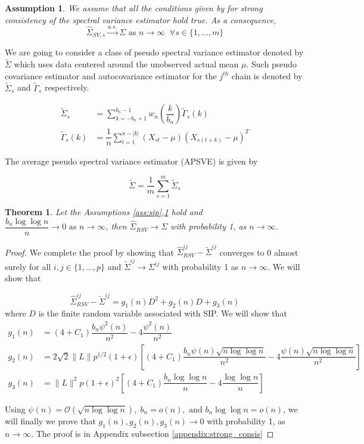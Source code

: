 \documentclass[12pt]{article}
\newtheorem{theorem}{Theorem}
\newtheorem{ass}{Assumption}
\begin{document}
\bigskip

\begin{ass} \label{ass:sve_consis} We assume that all the conditions given by \cite{vats:fleg:jon:2018} for strong consistency of the spectral variance estimator hold true. As a consequence, 
\[
\hat{\Sigma}_{SV,s} \xrightarrow{a.s.} \Sigma \textrm{ as } n \to \infty \;\; \forall s \in \{1,..., m\}
\]
\end{ass}

\bigskip

We are going to consider a class of pseudo spectral variance estimator denoted by $\tilde{\Sigma}$ which uses data centered around the unobserved actual mean $\mu$. Such pseudo covariance estimator and autocovariance estimator for the $j^{th}$ chain is denoted by $\tilde{\Sigma}_s$ and $\tilde{\Gamma}_s$ respectively.

\begin{align*}
    \tilde{\Sigma}_s &= \sum_{k=-b_n+1}^{b_n-1}w_n\left(\dfrac{k}{b_n}\right)\tilde{\Gamma}_s(k)\\
    \tilde{\Gamma}_s(k) &= \dfrac{1}{n}\sum_{t=1}^{n-|k|}(X_{st}-\mu)(X_{s(t+k)}-\mu)^T
\end{align*}

The average pseudo spectral variance estimator (APSVE) is given by

\[
\tilde{\Sigma} = \dfrac{1}{m}\sum\limits_{s=1}^{m}\tilde{\Sigma}_s
\]

\bigskip
\begin{theorem}
\label{th:consistency}
 Let the Assumptions \ref{ass:sip},\ref{ass:sve_consis} hold and $\dfrac{b_n \log \log n}{n} \to 0 \textrm{ as } n \to \infty$, then $\hat{\Sigma}_{RSV} \to \Sigma$ with probability 1, as $n \to \infty$.
\end{theorem} 

\begin{proof}
We complete the proof by showing that $\hat{\Sigma}_{RSV}^{ij} - \tilde{\Sigma}^{ij}$ converges to 0 almost surely for all $i,j \in \{1,...,p\}$ and $\tilde{\Sigma}^{ij} \to \Sigma^{ij}$ with probability 1 as $n \to \infty$. We will show that 

\[
\hat{\Sigma}_{RSV}^{ij} - \tilde{\Sigma}^{ij} = g_1(n)D^2 + g_2(n)D + g_3(n)
\]
where $D$ is the finite random variable associated with SIP. We will show that\\

\begin{align*}
    g_1(n) &= (4+C_1)\dfrac{b_n \psi^2(n)}{n^2} - 4\dfrac{\psi^2(n)}{n^2}\\
    g_2(n) &= 2\sqrt{2}\|L\|p^{1/2}(1+\epsilon)\left[(4+C_1)\dfrac{b_n\psi(n)\sqrt{n\log \log n}}{n^2} - 4\dfrac{\psi(n)\sqrt{n\log \log n}}{n^2}\right]\\
    g_3(n) &= \|L\|^2 p (1+\epsilon)^2\left[(4+C_1)\dfrac{b_n \log\log n}{n} - 4 \dfrac{\log \log n}{n}\right]
\end{align*}

Using $\psi(n) = \mathcal{O}(\sqrt{n \log \log n}),\; b_n = o(n), \textrm{ and } b_n \log \log n = o(n)$, we will finally we prove that $g_1(n), g_2(n), g_3(n) \to 0$ with probability 1, as $n \to \infty$. The proof is in Appendix subsection \ref{appendix:strong_consis}
\end{proof}
\end{document}

